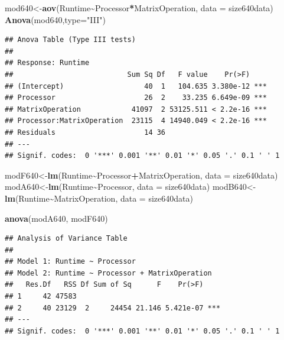 \documentclass[
]{article}
\newenvironment{Shaded}{\begin{snugshade}}{\end{snugshade}}
\newcommand{\DataTypeTok}[1]{\textcolor[rgb]{0.13,0.29,0.53}{#1}}
\newcommand{\KeywordTok}[1]{\textcolor[rgb]{0.13,0.29,0.53}{\textbf{#1}}}
\newcommand{\NormalTok}[1]{#1}
\newcommand{\OperatorTok}[1]{\textcolor[rgb]{0.81,0.36,0.00}{\textbf{#1}}}
\newcommand{\StringTok}[1]{\textcolor[rgb]{0.31,0.60,0.02}{#1}}
\begin{document}
\begin{Shaded}
\begin{Highlighting}[]
\NormalTok{mod640\textless{}{-}}\KeywordTok{aov}\NormalTok{(Runtime}\OperatorTok{\textasciitilde{}}\NormalTok{Processor}\OperatorTok{*}\NormalTok{MatrixOperation, }\DataTypeTok{data =}\NormalTok{ size640data)}
\KeywordTok{Anova}\NormalTok{(mod640,}\DataTypeTok{type=}\StringTok{"III"}\NormalTok{)}
\end{Highlighting}
\end{Shaded}

\begin{verbatim}
## Anova Table (Type III tests)
## 
## Response: Runtime
##                           Sum Sq Df   F value    Pr(>F)    
## (Intercept)                   40  1   104.635 3.380e-12 ***
## Processor                     26  2    33.235 6.649e-09 ***
## MatrixOperation            41097  2 53125.511 < 2.2e-16 ***
## Processor:MatrixOperation  23115  4 14940.049 < 2.2e-16 ***
## Residuals                     14 36                        
## ---
## Signif. codes:  0 '***' 0.001 '**' 0.01 '*' 0.05 '.' 0.1 ' ' 1
\end{verbatim}

\begin{Shaded}
\begin{Highlighting}[]
\NormalTok{modF640\textless{}{-}}\KeywordTok{lm}\NormalTok{(Runtime}\OperatorTok{\textasciitilde{}}\NormalTok{Processor}\OperatorTok{+}\NormalTok{MatrixOperation, }\DataTypeTok{data =}\NormalTok{ size640data)}
\NormalTok{modA640\textless{}{-}}\KeywordTok{lm}\NormalTok{(Runtime}\OperatorTok{\textasciitilde{}}\NormalTok{Processor, }\DataTypeTok{data =}\NormalTok{ size640data)}
\NormalTok{modB640\textless{}{-}}\KeywordTok{lm}\NormalTok{(Runtime}\OperatorTok{\textasciitilde{}}\NormalTok{MatrixOperation, }\DataTypeTok{data =}\NormalTok{ size640data)}

\KeywordTok{anova}\NormalTok{(modA640, modF640)}
\end{Highlighting}
\end{Shaded}

\begin{verbatim}
## Analysis of Variance Table
## 
## Model 1: Runtime ~ Processor
## Model 2: Runtime ~ Processor + MatrixOperation
##   Res.Df   RSS Df Sum of Sq      F    Pr(>F)    
## 1     42 47583                                  
## 2     40 23129  2     24454 21.146 5.421e-07 ***
## ---
## Signif. codes:  0 '***' 0.001 '**' 0.01 '*' 0.05 '.' 0.1 ' ' 1
\end{verbatim}
\end{document}
